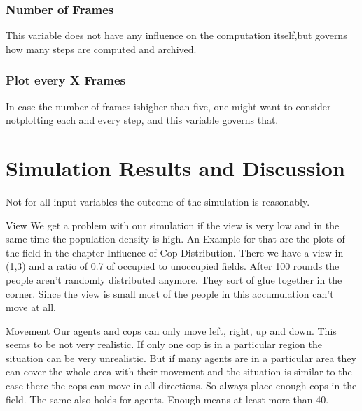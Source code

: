 \documentclass[11pt]{article}
\begin{document}
\subsubsection{Number of Frames}
This variable does not have any influence on the computation itself,but governs how many steps are computed and archived.

\subsubsection{Plot every X Frames}
In case the number of frames ishigher than five, one might want to consider notplotting each and every step, and this variable governs that.

\newpage

\section{Simulation Results and Discussion}


Not for all input variables the outcome of the simulation is reasonably.\newline\newline

View\newline
We get a problem with our simulation if the view is very low and in the same time the population density is high. An Example for that are the plots of the field in the chapter Influence of Cop Distribution.\newline
There we have a view in (1,3) and a ratio of 0.7 of occupied to unoccupied fields. After 100 rounds the people aren’t randomly distributed anymore. They sort of glue together in the corner. Since the view is small most of the people in this accumulation can’t move at all.\newline\newline

Movement\newline
Our agents and cops can only move left, right, up and down. This seems to be not very realistic. If only one cop is in a particular region the situation can be very unrealistic. But if many agents are in a particular area they can cover the whole area with their movement and the situation is similar to the case there the cops can move in all directions. So always place enough cops in the field. The same also holds for agents. Enough means at least more than 40.
\end{document}
